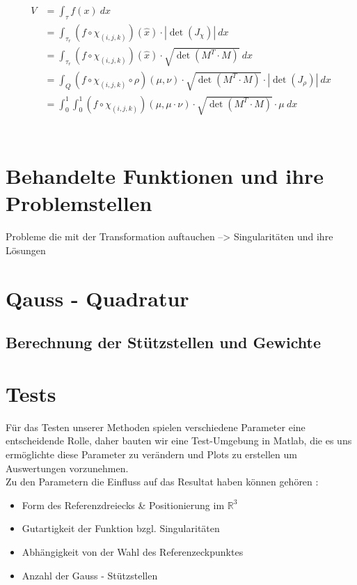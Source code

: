 \documentclass[12pt]{article}
\newcommand{\R}{\mathbb{R}}
\begin{document}
\begin{align*}
V &=\int_{\tau}f(x) \: dx\\
&= \int_{\tau_r}(f\circ\chi_{(i,j,k)})(\hat{x}) \cdot |\det(J_\chi)| \: dx\\
&= \int_{\tau_r}(f\circ\chi_{(i,j,k)})(\hat{x}) \cdot \sqrt{\det(M^T\cdot M)} \: dx\\
&=\int_{Q} (f\circ\chi_{(i,j,k)}\circ\rho)(\mu,\nu) \cdot \sqrt{\det(M^T\cdot M)} \cdot |\det(J_\rho)| \: dx\\
&=\int_{0}^{1}\int_{0}^{1} (f\circ\chi_{(i,j,k)})(\mu,\mu\cdot\nu) \cdot \sqrt{\det(M^T\cdot M)} \cdot \mu \:dx\\
\end{align*}
\\

\newpage

\section{Behandelte Funktionen und ihre Problemstellen}


Probleme die mit der Transformation auftauchen --> Singularitäten und ihre Lösungen

\newpage

\section{Qauss - Quadratur}
\subsection{Berechnung der Stützstellen und Gewichte}

\newpage

\section{Tests}

Für das Testen unserer Methoden spielen verschiedene Parameter eine entscheidende Rolle, daher bauten wir eine Test-Umgebung in Matlab, die es uns ermöglichte diese Parameter zu verändern und Plots zu erstellen um Auswertungen vorzunehmen.
\\
Zu den Parametern die Einfluss auf das Resultat haben können gehören :

\begin{itemize}
	\item Form des Referenzdreiecks \& Positionierung im $\R^3$
	\item Gutartigkeit der Funktion bzgl. Singularitäten
	\item Abhängigkeit von der Wahl des Referenzeckpunktes
	\item Anzahl der Gauss - Stützstellen
\end{itemize}
\end{document}
